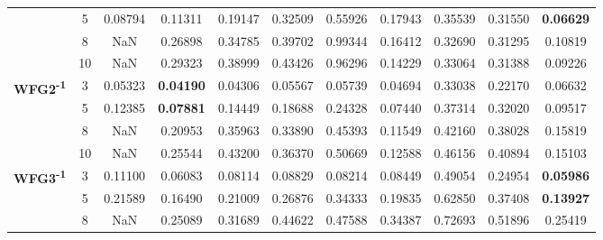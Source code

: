 \documentclass[conference]{IEEEtran}
\begin{document}
\begin{table*}[!htb]
\begin{tabular}{|c|c|c|c|c|c|c|c|c|c|c|}
		& 5          & 0.08794          & 0.11311           & 0.19147               & 0.32509          & 0.55926             & 0.17943             & 0.35539            & 0.31550              & \textbf{0.06629} \\ \cline{2-11} 
		& 8          & NaN              & 0.26898           & 0.34785               & 0.39702          & 0.99344             & 0.16412             & 0.32690            & 0.31295              & 0.10819          \\ \cline{2-11} 
		& 10         & NaN              & 0.29323           & 0.38999               & 0.43426          & 0.96296             & 0.14229             & 0.33064            & 0.31388              & 0.09226          \\ \hline
		\multirow{4}{*}{\textbf{WFG2\textsuperscript{-1}}}  & 3          & 0.05323          & \textbf{0.04190}  & 0.04306               & 0.05567          & 0.05739             & 0.04694             & 0.33038            & 0.22170              & 0.06632          \\ \cline{2-11} 
		& 5          & 0.12385          & \textbf{0.07881}  & 0.14449               & 0.18688          & 0.24328             & 0.07440             & 0.37314            & 0.32020              & 0.09517          \\ \cline{2-11} 
		& 8          & NaN              & 0.20953           & 0.35963               & 0.33890          & 0.45393             & 0.11549             & 0.42160            & 0.38028              & 0.15819          \\ \cline{2-11} 
		& 10         & NaN              & 0.25544           & 0.43200               & 0.36370          & 0.50669             & 0.12588             & 0.46156            & 0.40894              & 0.15103          \\ \hline
		\multirow{4}{*}{\textbf{WFG3\textsuperscript{-1}}}  & 3          & 0.11100          & 0.06083           & 0.08114               & 0.08829          & 0.08214             & 0.08449             & 0.49054            & 0.24954              & \textbf{0.05986} \\ \cline{2-11} 
		& 5          & 0.21589          & 0.16490           & 0.21009               & 0.26876          & 0.34333             & 0.19835             & 0.62850            & 0.37408              & \textbf{0.13927} \\ \cline{2-11} 
		& 8          & NaN              & 0.25089           & 0.31689               & 0.44622          & 0.47588             & 0.34387             & 0.72693            & 0.51896              & 0.25419          \\ \cline{2-11} 

\end{tabular}
\end{table*}
\end{document}
